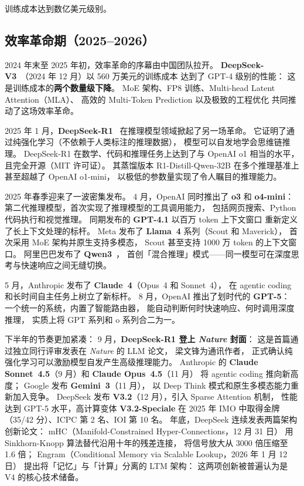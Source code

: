 训练成本达到数亿美元级别。

\subsection{效率革命期（2025--2026）}

2024 年末至 2025 年初，效率革命的序幕由中国团队拉开。
\textbf{DeepSeek-V3}~\cite{deepseekv3}（2024 年 12 月）以 560 万美元的训练成本
达到了 GPT-4 级别的性能：
这是训练成本的\textbf{两个数量级下降}。
MoE 架构、FP8 训练、Multi-head Latent Attention（MLA）、
高效的 Multi-Token Prediction 以及极致的工程优化
共同推动了这场效率革命。

2025 年 1 月，\textbf{DeepSeek-R1}~\cite{deepseekr1} 在推理模型领域掀起了另一场革命。
它证明了通过纯强化学习（不依赖于人类标注的推理数据），
模型可以自发地学会思维链推理。
DeepSeek-R1 在数学、代码和推理任务上达到了与 OpenAI o1 相当的水平，
且完全开源（MIT 许可证）。
其蒸馏版本 R1-Distill-Qwen-32B 在多个推理基准上
甚至超越了 OpenAI o1-mini，
以极低的参数量实现了令人瞩目的推理能力。

2025 年春季迎来了一波密集发布。
4 月，OpenAI 同时推出了 \textbf{o3} 和 \textbf{o4-mini}：
第二代推理模型，首次实现了推理模型的工具调用能力，
包括网页搜索、Python 代码执行和视觉推理。
同期发布的 \textbf{GPT-4.1} 以百万 token 上下文窗口
重新定义了长上下文处理的标杆。
Meta 发布了 \textbf{Llama~4} 系列（Scout 和 Maverick），
首次采用 MoE 架构并原生支持多模态，
Scout 甚至支持 1000 万 token 的上下文窗口。
阿里巴巴发布了 \textbf{Qwen3}~\cite{qwen2025qwen3}，
首创「混合推理」模式——同一模型可在深度思考与快速响应之间无缝切换。

5 月，Anthropic 发布了 \textbf{Claude~4}（Opus~4 和 Sonnet~4），
在 agentic coding 和长时间自主任务上树立了新标杆。
8 月，OpenAI 推出了划时代的 \textbf{GPT-5}：
一个统一的系统，内置了智能路由器，
能自动判断何时快速响应、何时调用深度推理，
实质上将 GPT 系列和 o 系列合二为一。

下半年的节奏更加紧凑：
9 月，\textbf{DeepSeek-R1 登上 \textit{Nature} 封面}：
这是首篇通过独立同行评审发表在 \textit{Nature} 的 LLM 论文，
梁文锋为通讯作者，
正式确认纯强化学习可以激励模型自发产生高级推理能力。
Anthropic 的 \textbf{Claude Sonnet~4.5}（9 月）和 \textbf{Claude Opus~4.5}（11 月）
将 agentic coding 推向新高度；
Google 发布 \textbf{Gemini~3}（11 月），
以 Deep Think 模式和原生多模态能力重新加入竞争。
DeepSeek 发布 \textbf{V3.2}（12 月），引入 Sparse Attention 机制，
性能达到 GPT-5 水平，高计算变体 \textbf{V3.2-Speciale}
在 2025 年 IMO 中取得金牌（35/42 分）、ICPC 第 2 名、IOI 第 10 名。
年底，DeepSeek 连续发表两篇架构创新论文：
mHC（Manifold-Constrained Hyper-Connections，12 月 31 日）
用 Sinkhorn-Knopp 算法替代沿用十年的残差连接，
将信号放大从 3000 倍压缩至 1.6 倍；
Engram（Conditional Memory via Scalable Lookup，2026 年 1 月 12 日）
提出将「记忆」与「计算」分离的 LTM 架构：
这两项创新被普遍认为是 V4 的核心技术储备。

